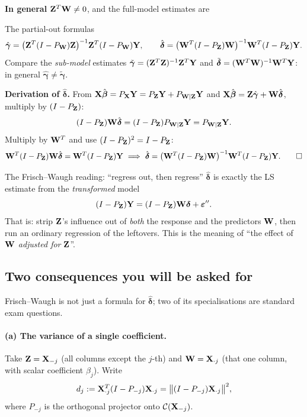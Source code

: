 \documentclass[11pt]{article}
\begin{document}
\textbf{In general $\mathbf{Z}^T\mathbf{W}\neq0$}, and the full-model estimates are

\begin{recipe}{The partial-out formulas}
\[
  \hat{\boldsymbol\gamma}=\big(\mathbf{Z}^T(I-P_{\mathbf{W}})\mathbf{Z}\big)^{-1}\mathbf{Z}^T(I-P_{\mathbf{W}})\mathbf{Y},
  \qquad
  \hat{\boldsymbol\delta}=\big(\mathbf{W}^T(I-P_{\mathbf{Z}})\mathbf{W}\big)^{-1}\mathbf{W}^T(I-P_{\mathbf{Z}})\mathbf{Y} .
\]
Compare the \emph{sub-model} estimates
$\tilde{\boldsymbol\gamma}=(\mathbf{Z}^T\mathbf{Z})^{-1}\mathbf{Z}^T\mathbf{Y}$ and
$\tilde{\boldsymbol\delta}=(\mathbf{W}^T\mathbf{W})^{-1}\mathbf{W}^T\mathbf{Y}$: in general
$\hat{\boldsymbol\gamma}\ne\tilde{\boldsymbol\gamma}$.
\end{recipe}

\textbf{Derivation of $\hat{\boldsymbol\delta}$.} From $\mathbf{X}\hat{\boldsymbol{\beta}}=P_{\mathbf{X}}\mathbf{Y}=P_{\mathbf{Z}}\mathbf{Y}+P_{\mathbf{W}\mid\mathbf{Z}}\mathbf{Y}$
and $\mathbf{X}\hat{\boldsymbol{\beta}}=\mathbf{Z}\hat{\boldsymbol\gamma}+\mathbf{W}\hat{\boldsymbol\delta}$, multiply by $(I-P_{\mathbf{Z}})$:
\[
  (I-P_{\mathbf{Z}})\mathbf{W}\hat{\boldsymbol\delta}=(I-P_{\mathbf{Z}})P_{\mathbf{W}\mid\mathbf{Z}}\mathbf{Y} = P_{\mathbf{W}\mid\mathbf{Z}}\mathbf{Y} .
\]
Multiply by $\mathbf{W}^T$ and use $(I-P_{\mathbf{Z}})^2=I-P_{\mathbf{Z}}$:
\[
  \mathbf{W}^T(I-P_{\mathbf{Z}})\mathbf{W}\hat{\boldsymbol\delta}=\mathbf{W}^T(I-P_{\mathbf{Z}})\mathbf{Y}
  \ \Longrightarrow\
  \hat{\boldsymbol\delta}=\big(\mathbf{W}^T(I-P_{\mathbf{Z}})\mathbf{W}\big)^{-1}\mathbf{W}^T(I-P_{\mathbf{Z}})\mathbf{Y} . \qquad\square
\]

\begin{idea}{The Frisch--Waugh reading: ``regress out, then regress''}
$\hat{\boldsymbol\delta}$ is exactly the LS estimate from the \emph{transformed} model
\[
  (I-P_{\mathbf{Z}})\mathbf{Y} = (I-P_{\mathbf{Z}})\mathbf{W}\boldsymbol\delta+\boldsymbol{\varepsilon}'' .
\]
That is: strip $\mathbf{Z}$'s influence out of \emph{both} the response and the predictors $\mathbf{W}$,
then run an ordinary regression of the leftovers. This is the meaning of ``the effect of
$\mathbf{W}$ \emph{adjusted for} $\mathbf{Z}$''.
\end{idea}

\subsection{Two consequences you will be asked for}

Frisch--Waugh is not just a formula for $\hat{\boldsymbol\delta}$; two of its specialisations
are standard exam questions.

\paragraph{(a) The variance of a single coefficient.}
Take $\mathbf{Z}=\mathbf{X}_{-j}$ (all columns except the $j$-th) and $\mathbf{W}=\mathbf{X}_{\cdot j}$ (that one
column, with scalar coefficient $\beta_j$). Write
\[
  d_j:=\mathbf{X}_{\cdot j}^T(I-P_{-j})\mathbf{X}_{\cdot j}=\big\|(I-P_{-j})\mathbf{X}_{\cdot j}\big\|^2,
\]
where $P_{-j}$ is the orthogonal projector onto $\mathcal{C}(\mathbf{X}_{-j})$.
\end{document}
